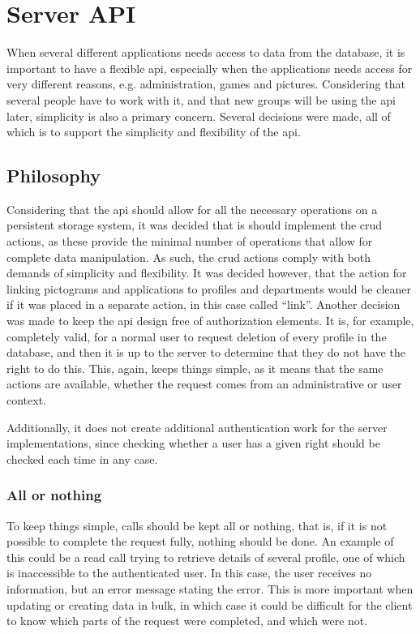 \section{Server API}

When several different applications needs access to data from the database, it is important to have a flexible \ac{api}, especially when 
the applications needs access for very different reasons, e.g. administration, games and pictures. Considering that several people have to
work with it, and that new groups will be using the \ac{api} later, simplicity is also a primary concern. Several decisions were made, all of
which is to support the simplicity and flexibility of the \ac{api}.

\subsection{Philosophy}

Considering that the \ac{api} should allow for all the necessary operations on a persistent storage system, it was decided that is should
implement the \ac{crud} actions, as these provide the minimal number of operations that allow for complete data manipulation. \citep{crud13}
As such, the \ac{crud} actions comply with both demands of simplicity and flexibility. It was decided however, that the action for linking pictograms
and applications to profiles and departments would be cleaner if it was placed in a separate action, in this case called ``link''.\p
Another decision was made to keep the \ac{api} design free of authorization elements. It is, for example, completely valid, for a normal user
to request deletion of every profile in the database, and then it is up to the server to determine that they do not have the right to do this.
This, again, keeps things simple, as it means that the same actions are available, whether the request comes from an administrative or
user context.

Additionally, it does not create additional authentication work for the server implementations, since checking whether a user has a given right
should be checked each time in any case.

\subsubsection*{All or nothing}

To keep things simple, calls should be kept all or nothing, that is, if it is not possible to complete the request fully, nothing should be done.
An example of this could be a read call trying to retrieve details of several profile, one of which is inaccessible to the authenticated user. In this case, the
user receives no information, but an error message stating the error. This is more important when updating or creating data in bulk, in which case
it could be difficult for the client to know which parts of the request were completed, and which were not.

